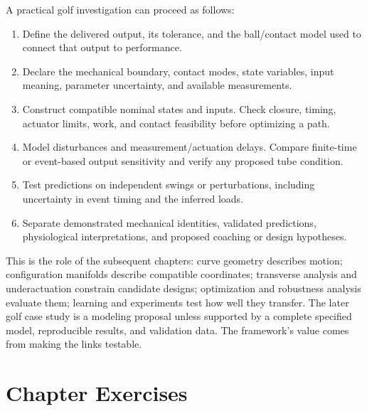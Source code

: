 A practical golf investigation can proceed as follows:
\begin{enumerate}
\item Define the delivered output, its tolerance, and the ball/contact model
      used to connect that output to performance.
\item Declare the mechanical boundary, contact modes, state variables, input
      meaning, parameter uncertainty, and available measurements.
\item Construct compatible nominal states and inputs. Check closure, timing,
      actuator limits, work, and contact feasibility before optimizing a path.
\item Model disturbances and measurement/actuation delays. Compare finite-time
      or event-based output sensitivity and verify any proposed tube condition.
\item Test predictions on independent swings or perturbations, including
      uncertainty in event timing and the inferred loads.
\item Separate demonstrated mechanical identities, validated predictions,
      physiological interpretations, and proposed coaching or design hypotheses.
\end{enumerate}

This is the role of the subsequent chapters: curve geometry describes motion;
configuration manifolds describe compatible coordinates; transverse analysis
and underactuation constrain candidate designs; optimization and robustness
analysis evaluate them; learning and experiments test how well they transfer.
The later golf case study is a modeling proposal unless supported by a complete
specified model, reproducible results, and validation data. The framework's
value comes from making the links testable.

\section{Chapter Exercises}

